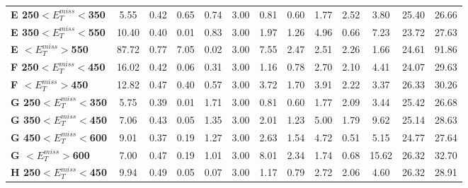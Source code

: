 \begin{table}[h]
\begin{center}
{\begin{tabular}{|l|cccccccccccc|}
\textbf{ E 250$<E_T^{miss}<$350}         & 5.55          & 0.42          & 0.65          & 0.74          & 3.00          & 0.81          & 0.60          & 1.77          & 2.52          & 3.80          & 25.40         & 26.66         \\
\textbf{ E 350$<E_T^{miss}<$550}         & 10.40         & 0.40          & 0.01          & 0.83          & 3.00          & 1.97          & 1.26          & 4.96          & 0.66          & 7.23          & 23.72         & 27.63         \\
\textbf{ E $<E_T^{miss}>$550}    & 87.72         & 0.77          & 7.05          & 0.02          & 3.00          & 7.55          & 2.47          & 2.51          & 2.26          & 1.66          & 24.61         & 91.86         \\
\textbf{ F 250$<E_T^{miss}<$450}         & 16.02         & 0.42          & 0.06          & 0.31          & 3.00          & 1.16          & 0.78          & 2.70          & 2.10          & 4.41          & 24.07         & 29.63         \\
\textbf{ F $<E_T^{miss}>$450}    & 12.82         & 0.47          & 0.40          & 0.57          & 3.00          & 3.72          & 1.70          & 3.91          & 2.22          & 3.37          & 26.33         & 30.26         \\
\textbf{ G 250$<E_T^{miss}<$350}         & 5.75          & 0.39          & 0.01          & 1.71          & 3.00          & 0.81          & 0.60          & 1.77          & 2.09          & 3.44          & 25.42         & 26.68         \\
\textbf{ G 350$<E_T^{miss}<$450}         & 7.06          & 0.43          & 0.05          & 1.35          & 3.00          & 2.01          & 1.23          & 5.00          & 1.79          & 9.62          & 25.14         & 28.63         \\
\textbf{ G 450$<E_T^{miss}<$600}         & 9.01          & 0.37          & 0.19          & 1.27          & 3.00          & 2.63          & 1.54          & 4.72          & 0.51          & 5.15          & 24.77         & 27.64         \\
\textbf{ G $<E_T^{miss}>$600}    & 7.00          & 0.47          & 0.19          & 1.01          & 3.00          & 8.01          & 2.34          & 1.74          & 0.68          & 15.62         & 26.32         & 32.70         \\
\textbf{ H 250$<E_T^{miss}<$450}         & 9.94          & 0.49          & 0.05          & 0.07          & 3.00          & 1.17          & 0.79          & 2.72          & 2.06          & 4.60          & 26.32         & 28.91         \\

\end{tabular}}
\end{center}
\end{table}
